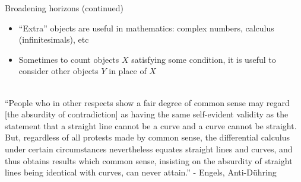 \documentclass{beamer}
\theoremstyle{definition}
\begin{document}
                                                                                                           \begin{frame}{Broadening horizons (continued)}

                                                                                                             \begin{itemize}

                                                                                                             \item ``Extra'' objects are useful in mathematics: complex numbers, calculus (infinitesimals), etc
                                                                                                             \item Sometimes to count objects $X$ satisfying some condition, it is useful to consider
                                                                                                               other objects $Y$ in place of $X$
                                                                                                             \end{itemize}
                                                                                                             ~\\
``People who in other respects show a fair degree of common sense may regard [the absurdity of contradiction] as having the same self-evident validity as the statement that a straight line cannot be a curve and a curve cannot be straight. But, regardless of all protests made by common sense, the differential calculus under certain circumstances nevertheless equates straight lines and curves, and thus obtains results which common sense, insisting on the absurdity of straight lines being identical with curves, can never attain.'' - Engels, Anti-Dühring


                                                                                                           \end{frame}
\end{document}
